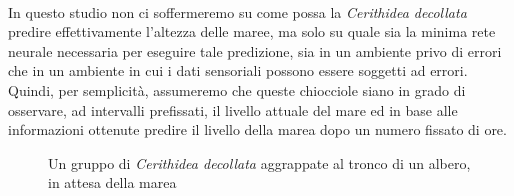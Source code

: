 			\\
			In questo studio non ci soffermeremo su come possa la \textit{Cerithidea decollata} predire effettivamente l'altezza delle maree, ma solo su quale sia la minima rete neurale necessaria per eseguire tale predizione, sia in un ambiente privo di errori che in un ambiente in cui i dati sensoriali possono essere soggetti ad errori.\\
			Quindi, per semplicità, assumeremo che queste chiocciole siano in grado di osservare, ad intervalli prefissati, il livello attuale del mare ed in base alle informazioni ottenute predire il livello della marea dopo un numero fissato di ore.
			\begin{figure}[h]
				\begin{center}
					\setlength\fboxsep{0pt}
					\setlength\fboxrule{2pt}
				\end{center}
				\caption{Un gruppo di \textit{Cerithidea decollata} aggrappate al tronco di un albero, in attesa della marea}
			\end{figure}